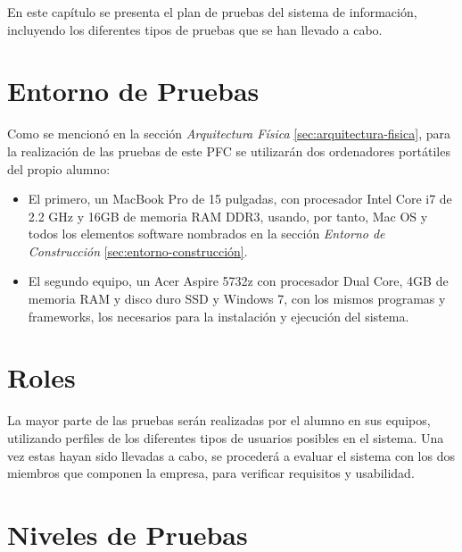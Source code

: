 

En este capí­tulo se presenta el plan de pruebas del sistema de información, incluyendo los diferentes tipos de pruebas que se han llevado a cabo.


\section{Entorno de Pruebas}

Como se mencionó en la sección \textit{Arquitectura Física} \ref{sec:arquitectura-fisica}, para la realización de las pruebas de este PFC se utilizarán dos ordenadores portátiles del propio alumno: 

\begin{itemize}
\item El primero, un MacBook Pro de 15 pulgadas, con procesador Intel Core i7 de 2.2 GHz y 16GB de memoria RAM DDR3, usando, por tanto, Mac OS y todos los elementos software nombrados en la sección \textit{Entorno de Construcción} \ref{sec:entorno-construcción}. 
\item El segundo equipo, un Acer Aspire 5732z con procesador Dual Core, 4GB de memoria RAM y disco duro SSD y Windows 7, con los mismos programas y frameworks, los necesarios para la instalación y ejecución del sistema.
\end{itemize}


\section{Roles}

La mayor parte de las pruebas serán realizadas por el alumno en sus equipos, utilizando perfiles de los diferentes tipos de usuarios posibles en el sistema. Una vez estas hayan sido llevadas a cabo, se procederá a evaluar el sistema con los dos miembros que componen la empresa, para verificar requisitos y usabilidad.


\section{Niveles de Pruebas}

